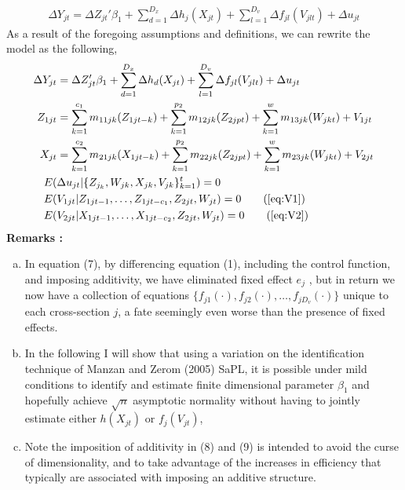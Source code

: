\documentclass[10pt]{article}
\begin{document}
\begin{align*} 
\Delta Y_{jt} = \Delta Z_{jt}'\beta_1 + \sum_{d=1}^{D_x} \Delta h_{j}(X_{jt}) + \sum_{l=1}^{D_v} \Delta f_{jl}(V_{jlt}) + \Delta u_{jt}
\end{align*}
As a result of the foregoing assumptions and definitions, we can rewrite the model as the following, 
\begin{align} 
\Delta Y_{jt} &= \Delta Z_{jt}'\beta_1 + \sum_{d=1}^{D_x} \Delta h_{d}(X_{jt}) + \sum_{l=1}^{D_v} \Delta f_{jl}(V_{jlt}) + \Delta u_{jt} \\
%
Z_{1jt} &= \sum_{k = 1}^{c_1} m_{11jk}(Z_{1jt-k}) + \sum_{k=1}^{p_2}m_{12jk}(Z_{2jpt}) + \sum_{k=1}^w m_{13jk}(W_{jkt}) + V_{1jt} \\
%
X_{jt} &= \sum_{k = 1}^{c_2} m_{21jk}(X_{1jt-k}) + \sum_{k=1}^{p_2}m_{22jk}(Z_{2jpt}) + \sum_{k=1}^w m_{23jk}(W_{jkt})  + V_{2jt} \\
%
E(&\Delta u_{jt} | \{Z_{j_k},W_{jk},X_{jk},V_{jk} \}_{k=1}^t) = 0 \\
%
E(& V_{1jt} | Z_{1jt-1},\ldots,Z_{1jt-c_1},Z_{2jt},W_{jt}) = 0 \tag{\ref{eq:V1}} \\
%
E(& V_{2jt} | X_{1jt-1},\ldots,X_{1jt-c_2},Z_{2jt},W_{jt}) = 0 \tag{\ref{eq:V2}}
\end{align}
%
\noindent \bf Remarks \rm:
\begin{enumerate}[a.)] 
    \item In equation (7), by differencing equation (1), including the control function, and imposing additivity, we have eliminated fixed effect $e_j$ , but in return we now have a collection of equations $\{f_{j1}(\cdot),f_{j2}(\cdot), \ldots , f_{jD_v}(\cdot)\}$ unique to each cross-section $j$, a fate seemingly even worse than the presence of fixed effects. 
    \item In the following I will show that using a variation on the identification technique of Manzan and Zerom (2005) SaPL, it is possible under mild conditions to identify and estimate finite dimensional parameter $\beta_1$  and hopefully achieve $\sqrt{n}$ asymptotic normality  without having to jointly estimate either $h(X_{jt})$ or $f_j(V_{jt})$,  
    \item Note the imposition of additivity in (8) and (9) is intended to avoid the curse of dimensionality, and to take advantage of the increases in efficiency that typically are associated with imposing an additive structure.
\end{enumerate}
\end{document}
